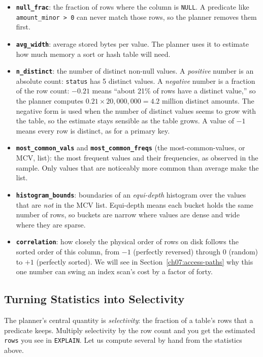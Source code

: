 \begin{itemize}
  \item \textbf{\texttt{null\_frac}}: the fraction of rows where the column is \texttt{NULL}. A predicate like \texttt{amount\_minor > 0} can never match those rows, so the planner removes them first.
  \item \textbf{\texttt{avg\_width}}: average stored bytes per value. The planner uses it to estimate how much memory a sort or hash table will need.
  \item \textbf{\texttt{n\_distinct}}: the number of distinct non-null values. A \emph{positive} number is an absolute count: \texttt{status} has 5 distinct values. A \emph{negative} number is a fraction of the row count: $-0.21$ means ``about 21\% of rows have a distinct value,'' so the planner computes $0.21 \times 20{,}000{,}000 = 4.2$ million distinct amounts. The negative form is used when the number of distinct values seems to grow with the table, so the estimate stays sensible as the table grows. A value of $-1$ means every row is distinct, as for a primary key.
  \item \textbf{\texttt{most\_common\_vals}} and \textbf{\texttt{most\_common\_freqs}} (the most-common-values, or MCV, list): the most frequent values and their frequencies, as observed in the sample. Only values that are noticeably more common than average make the list.
  \item \textbf{\texttt{histogram\_bounds}}: boundaries of an \emph{equi-depth} histogram over the values that are \emph{not} in the MCV list. Equi-depth means each bucket holds the same number of rows, so buckets are narrow where values are dense and wide where they are sparse.
  \item \textbf{\texttt{correlation}}: how closely the physical order of rows on disk follows the sorted order of this column, from $-1$ (perfectly reversed) through $0$ (random) to $+1$ (perfectly sorted). We will see in Section~\ref{ch07:access-paths} why this one number can swing an index scan's cost by a factor of forty.
\end{itemize}

\subsection{Turning Statistics into Selectivity}

The planner's central quantity is \emph{selectivity}: the fraction of a table's rows that a predicate keeps. Multiply selectivity by the row count and you get the estimated \texttt{rows} you see in \texttt{EXPLAIN}. Let us compute several by hand from the statistics above.

